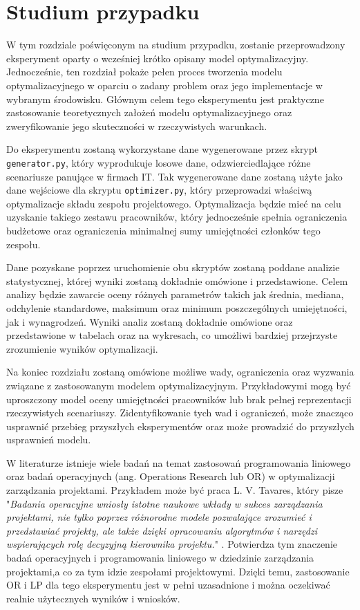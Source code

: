 \chapter{Studium przypadku}
\par W tym rozdziale poświęconym na studium przypadku, zostanie przeprowadzony eksperyment oparty o wcześniej krótko opisany model optymalizacyjny. Jednocześnie, ten rozdział pokaże pełen proces tworzenia modelu optymalizacyjnego w oparciu o zadany problem oraz jego implementacje w wybranym środowisku. Głównym celem tego eksperymentu jest praktyczne zastosowanie teoretycznych założeń modelu optymalizacyjnego oraz zweryfikowanie jego skuteczności w rzeczywistych warunkach. 
\par Do eksperymentu zostaną wykorzystane dane wygenerowane przez skrypt \verb|generator.py|, który wyprodukuje losowe dane, odzwierciedlające różne scenariusze panujące w firmach IT. Tak wygenerowane dane zostaną użyte jako dane wejściowe dla skryptu \verb|optimizer.py|, który przeprowadzi właściwą optymalizacje składu zespołu projektowego. Optymalizacja będzie mieć na celu uzyskanie takiego zestawu pracowników, który jednocześnie spełnia ograniczenia budżetowe oraz ograniczenia minimalnej sumy umiejętności członków tego zespołu.
\par Dane pozyskane poprzez uruchomienie obu skryptów zostaną poddane analizie statystycznej, której wyniki zostaną dokładnie omówione i przedstawione. Celem analizy będzie zawarcie oceny różnych parametrów takich jak średnia, mediana, odchylenie standardowe, maksimum oraz minimum poszczególnych umiejętności, jak i wynagrodzeń.  Wyniki analiz zostaną dokładnie omówione oraz przedstawione w tabelach oraz na wykresach, co umożliwi bardziej przejrzyste zrozumienie wyników optymalizacji.
\par Na koniec rozdziału zostaną omówione możliwe wady, ograniczenia oraz wyzwania związane z zastosowanym modelem optymalizacyjnym. Przykładowymi mogą być uproszczony model oceny umiejętności pracowników lub brak pełnej reprezentacji rzeczywistych scenariuszy. Zidentyfikowanie tych wad i ograniczeń, może znacząco usprawnić przebieg przyszłych eksperymentów oraz może prowadzić do przyszłych usprawnień modelu.
\par W literaturze istnieje wiele badań na temat zastosowań programowania liniowego oraz badań operacyjnych (ang. Operations Research lub OR) w optymalizacji zarządzania projektami. Przykładem może być praca L. V. Tavares, który pisze "\textit{Badania operacyjne wniosły istotne naukowe wkłady w sukces zarządzania projektami, nie tylko poprzez różnorodne modele pozwalające zrozumieć i przedstawiać projekty, ale także dzięki opracowaniu algorytmów i narzędzi wspierających rolę decyzyjną kierownika projektu.}" \parencite{tavares2002review}. Potwierdza tym znaczenie badań operacyjnych i programowania liniowego w dziedzinie zarządzania projektami,a co za tym idzie zespołami projektowymi. Dzięki temu, zastosowanie OR i LP dla tego eksperymentu jest w pełni uzasadnione i można oczekiwać realnie użytecznych wyników i wniosków.

